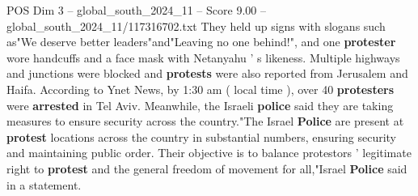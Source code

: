 \begin{textsample}{POS Dim 3 – global\_south\_2024\_11 – Score 9.00 – global\_south\_2024\_11/117316702.txt}
They held up signs with slogans such as"We deserve better leaders"and"Leaving no one behind!", and one \textbf{protester} wore handcuffs and a face mask with Netanyahu ' s likeness.
Multiple highways and junctions were blocked and \textbf{protests} were also reported from Jerusalem and Haifa.
According to Ynet News, by 1:30 am ( local time ), over 40 \textbf{protesters} were \textbf{arrested} in Tel Aviv.
Meanwhile, the Israeli \textbf{police} said they are taking measures to ensure security across the country."The Israel \textbf{Police} are present at \textbf{protest} locations across the country in substantial numbers, ensuring security and maintaining public order.
Their objective is to balance protestors ' legitimate right to \textbf{protest} and the general freedom of movement for all,"Israel \textbf{Police} said in a statement.

\end{textsample}
